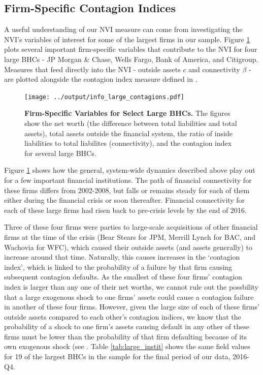 \subsection{Firm-Specific Contagion Indices}

A useful understanding of our NVI measure can come from investigating the NVI's variables of interest for some of the largest firms in our sample. Figure \ref{fig:info_large_contagions} plots several important firm-specific variables that contribute to the NVI for four large BHCs - JP Morgan \& Chase, Wells Fargo, Bank of America, and Citigroup. Measures that feed directly into the NVI - outside assets $c$ and connectivity $\beta$ - are plotted alongside the contagion index measure defined in . 

\begin{figure}[h!]
\begin{center}
\texttt{[image: ../output/info\_large\_contagions.pdf]}
\end{center}
\caption[]{\textbf{Firm-Specific Variables for Select Large BHCs.} The figures show the net worth (the difference between total liabilities and total assets), total assets outside the financial system, the ratio of inside liabilities to total liabilites (connectivity), and the contagion index for several large BHCs.} \label{fig:info_large_contagions}
\end{figure}

Figure \ref{fig:info_large_contagions} shows how the general, system-wide dynamics described above play out for a few important financial institutions. The path of financial connectivity for these firms differs from 2002-2008, but falls or remains steady for each of them either during the financial crisis or soon thereafter. Financial connectivity for each of these large firms had risen back to pre-crisis levels by the end of 2016.

Three of these four firms were parties to large-scale acquisitions of other financial firms at the time of the crisis (Bear Stears for JPM, Merrill Lynch for BAC, and Wachovia for WFC), which caused their outside assets (and assets generally) to increase around that time. Naturally, this causes increases in the `contagion index', which is linked to the probability of a failure by that firm causing subsequent contagion defaults. As the smallest of these four firms' contagion index is larger than any one of their net worths, we cannot rule out the possbility that a large exogenous shock to one firms' assets could cause a contagion failure in another of these four firms. However, given the large size of each of these firms' outside assets compared to each other's contagion indices, we know that the probability of a shock to one firm's assets causing default in any other of these firms must be lower than the probability of that firm defaulting because of its own exogenous shock (see 
\citet{glasserman2015likely}. Table \ref{tab:large_instit} shows the same field values for 19 of the largest BHCs in the sample for the final period of our data, 2016-Q4.

